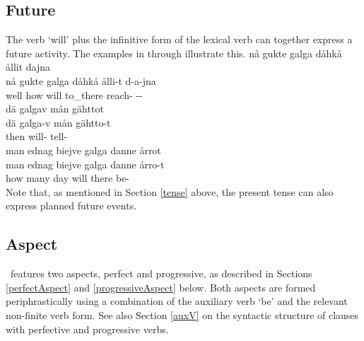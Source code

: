 \subsection{Future}\label{futureTense}
The verb  ‘will’ plus the infinitive form of the lexical verb can together express a future activity. The examples in  through  illustrate this.
\ea\label{futureTenseEx1}%
\glll	nå gukte galga dåhkå ållit dajna\\
	nå gukte galga dåhkå ålli-t d-a-jna\\
	well how will\BS{} to\_there reach- --\\\nopagebreak
{}	
\z
\ea\label{futureTenseEx2}%
\glll	dä galgav mån gähttot\\
	dä galga-v mån gähtto-t\\
	then will-  tell-\\\nopagebreak
{}	
\z
\ea\label{futureTenseEx3}%
\glll	man ednag biejve galga danne årrot\\
	man ednag biejve galga danne årro-t\\
	how many day\BS{} will\BS{} there be-\\\nopagebreak
{}	
\z
Note that, as mentioned in Section \ref{tense} above, the present tense can also express planned future events. 

\subsection{Aspect}\label{aspect}
\PS\ features two aspects, perfect and progressive, as described in Sections \ref{perfectAspect} and \ref{progressiveAspect} below. Both aspects are formed periphrastically using a combination of the auxiliary verb  ‘be’ and the relevant non-finite verb form. 
See also Section \ref{auxV} on the syntactic structure of clauses with perfective and progressive verbs. 

